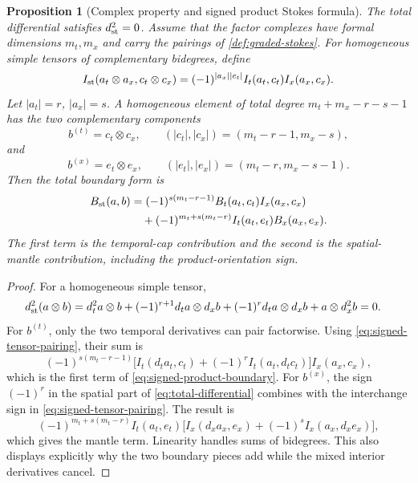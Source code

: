 \documentclass[11pt,a4paper]{article}
\newtheorem{proposition}[theorem]{Proposition}
\begin{document}
\begin{proposition}[Complex property and signed product Stokes formula]
\label{prop:total-complex}
The total differential satisfies \(d_{\rm st}^2=0\).
Assume that the factor complexes have formal dimensions \(m_t,m_x\) and
carry the pairings of \cref{def:graded-stokes}.  For homogeneous simple
tensors of complementary bidegrees, define
\begin{equation}\label{eq:signed-tensor-pairing}
 I_{\rm st}(a_t\otimes a_x,c_t\otimes c_x)
 =(-1)^{|a_x||c_t|}
 I_t(a_t,c_t)I_x(a_x,c_x).
\end{equation}
Let \(|a_t|=r\), \(|a_x|=s\).  A homogeneous element of total degree
\(m_t+m_x-r-s-1\) has the two complementary components
\[
 b^{(t)}=c_t\otimes c_x,\qquad
 (|c_t|,|c_x|)=(m_t-r-1,m_x-s),
\]
and
\[
 b^{(x)}=e_t\otimes e_x,\qquad
 (|e_t|,|e_x|)=(m_t-r,m_x-s-1).
\]
Then the total boundary form is
\begin{align}
 B_{\rm st}(a,b)
 &=(-1)^{s(m_t-r-1)}
   B_t(a_t,c_t)I_x(a_x,c_x)\notag\\
 &\quad+(-1)^{m_t+s(m_t-r)}
   I_t(a_t,e_t)B_x(a_x,e_x).
 \label{eq:signed-product-boundary}
\end{align}
The first term is the temporal-cap contribution and the second is the
spatial-mantle contribution, including the product-orientation sign.
\end{proposition}

\begin{proof}
For a homogeneous simple tensor,
\begin{align*}
 d_{\rm st}^2(a\otimes b)
 &=d_t^2a\otimes b
   +(-1)^{r+1}d_ta\otimes d_xb
   +(-1)^r d_ta\otimes d_xb
   +a\otimes d_x^2b=0.
\end{align*}
For \(b^{(t)}\), only the two temporal derivatives can pair factorwise.
Using \cref{eq:signed-tensor-pairing}, their sum is
\[
 (-1)^{s(m_t-r-1)}
 \bigl[I_t(d_ta_t,c_t)+(-1)^rI_t(a_t,d_tc_t)\bigr]
 I_x(a_x,c_x),
\]
which is the first term of \cref{eq:signed-product-boundary}.  For
\(b^{(x)}\), the sign \((-1)^r\) in the spatial part of
\cref{eq:total-differential} combines with the interchange sign in
\cref{eq:signed-tensor-pairing}.  The result is
\[
 (-1)^{m_t+s(m_t-r)}I_t(a_t,e_t)
 \bigl[I_x(d_xa_x,e_x)+(-1)^sI_x(a_x,d_xe_x)\bigr],
\]
which gives the mantle term.  Linearity handles sums of bidegrees.  This
also displays explicitly why the two boundary pieces add while the mixed
interior derivatives cancel.
\end{proof}
\end{document}
